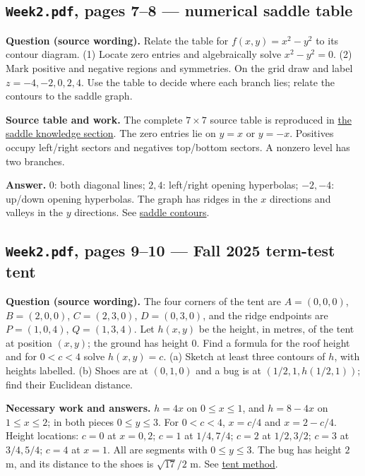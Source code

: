 \subsection{\texttt{Week2.pdf}, pages 7--8 --- numerical saddle table}
\textbf{Question (source wording).} Relate the table for $f(x,y)=x^2-y^2$ to its contour diagram. (1) Locate zero entries and algebraically solve $x^2-y^2=0$. (2) Mark positive and negative regions and symmetries. On the grid draw and label $z=-4,-2,0,2,4$. Use the table to decide where each branch lies; relate the contours to the saddle graph.\par
\textbf{Source table and work.} The complete $7\times7$ source table is reproduced in \hyperref[saddle]{the saddle knowledge section}. The zero entries lie on $y=x$ or $y=-x$. Positives occupy left/right sectors and negatives top/bottom sectors. A nonzero level has two branches.\par
\textbf{Answer.} $0$: both diagonal lines; $2,4$: left/right opening hyperbolas; $-2,-4$: up/down opening hyperbolas. The graph has ridges in the $x$ directions and valleys in the $y$ directions. See \hyperref[saddle]{saddle contours}.

\subsection{\texttt{Week2.pdf}, pages 9--10 --- Fall 2025 term-test tent}
\textbf{Question (source wording).} The four corners of the tent are $A=(0,0,0)$, $B=(2,0,0)$, $C=(2,3,0)$, $D=(0,3,0)$, and the ridge endpoints are $P=(1,0,4)$, $Q=(1,3,4)$. Let $h(x,y)$ be the height, in metres, of the tent at position $(x,y)$; the ground has height $0$. Find a formula for the roof height and for $0<c<4$ solve $h(x,y)=c$. (a) Sketch at least three contours of $h$, with heights labelled. (b) Shoes are at $(0,1,0)$ and a bug is at $(1/2,1,h(1/2,1))$; find their Euclidean distance.\par
\textbf{Necessary work and answers.} $h=4x$ on $0\leq x\leq1$, and $h=8-4x$ on $1\leq x\leq2$; in both pieces $0\leq y\leq3$. For $0<c<4$, $x=c/4$ and $x=2-c/4$. Height locations: $c=0$ at $x=0,2$; $c=1$ at $1/4,7/4$; $c=2$ at $1/2,3/2$; $c=3$ at $3/4,5/4$; $c=4$ at $x=1$. All are segments with $0\leq y\leq3$. The bug has height $2$ m, and its distance to the shoes is $\sqrt{17}/2$ m. See \hyperref[tent]{tent method}.

